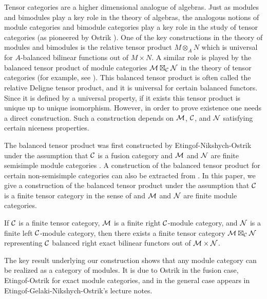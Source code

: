 \documentclass{amsart}
\begin{document}
\tikzexternaldisable




Tensor categories are a higher dimensional analogue of algebras.  Just as modules and bimodules play a key role in the theory of algebras, the analogous notions of module categories and bimodule categories play a key role in the study of tensor categories (as pioneered by Ostrik \cite{MR1976459}).  One of the key constructions in the theory of modules and bimodules is the relative tensor product $M \otimes_A N$ which is universal for $A$-balanced bilinear functions out of $M \times N$.   A similar role is played by the balanced tensor product of module categories $\mathcal M \boxtimes_\mathcal C \mathcal N$ in the theory of tensor categories (for example, see \cite{MR1966524, 0909.3140, MR2511638, MR2909758, 1202.4396, MR3022755, MR3063919}).  This balanced tensor product is often called the relative Deligne tensor product, and it is universal for certain balanced functors.  Since it is defined by a universal property, if it exists this tensor product is unique up to unique isomorphism.  However, in order to prove existence one needs a direct construction.  Such a construction depends on $\mathcal M$, $\mathcal C$, and $\mathcal N$ satisfying certain niceness properties.  

The balanced tensor product was first constructed by Etingof-Nikshych-Ostrik under the assumption that $\mathcal C$ is a fusion category and $\mathcal M$ and $\mathcal N$ are finite semisimple module categories \cite{0909.3140}.  A construction of the balanced tensor product for certain non-semisimple categories can also be extracted from \cite[Thm 3.1]{1102.3411}.   In this paper, we give a construction of the balanced tensor product under the assumption that $\mathcal C$ is a finite tensor category in the sense of \cite{EO-ftc} and $\mathcal M$ and $\mathcal N$ are finite module categories.  

\begin{theorem}
If $\mathcal C$ is a finite tensor category, $\mathcal M$ is a finite right $\mathcal C$-module category, and $\mathcal N$ is a finite left $\mathcal C$-module category, then there exists a finite tensor category $\mathcal M \boxtimes_\mathcal C \mathcal N$ representing $\mathcal C$ balanced right exact bilinear functors out of $\mathcal M \times \mathcal N$.
\end{theorem}

The key result underlying our construction shows that any module category can be realized as a category of modules.  It is due to Ostrik in the fusion case, Etingof-Ostrik for exact module categories, and in the general case appears in Etingof-Gelaki-Nikshych-Ostrik's lecture notes.
\end{document}
